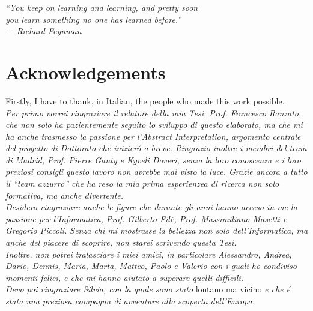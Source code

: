 \cleardoublepage
{}
{}

\begin{flushright}{
	\slshape
	``You keep on learning and learning, and pretty soon \\ you learn something no one has learned before.''} \\
	\medskip
    --- \emph{Richard Feynman}
\end{flushright}


\bigskip

\begingroup
\let\clearpage\relax
\let\cleardoublepage\relax
\let\cleardoublepage\relax

\chapter*{Acknowledgements}

\noindent Firstly, I have to thank, in Italian, the people who made this work possible. \\

\textit{Per primo vorrei ringraziare il relatore della mia Tesi, Prof. Francesco Ranzato, che non solo ha pazientemente seguito lo sviluppo di questo elaborato,
ma che mi ha anche trasmesso la passione per l'Abstract Interpretation, argomento centrale del progetto di Dottorato che inizieró a breve.
Ringrazio inoltre i membri del team di Madrid, Prof. Pierre Ganty e Kyveli Doveri,
senza la loro conoscenza e i loro preziosi consigli questo lavoro non avrebbe mai visto la luce.
Grazie ancora a tutto il ``team azzurro'' che ha reso la mia prima esperienzea di ricerca non solo formativa,
ma anche divertente.  }\\

\emph{Desidero ringraziare anche le figure che durante gli anni hanno acceso in me la passione per l'Informatica,
Prof. Gilberto Filé, Prof. Massimiliano Masetti e Gregorio Piccoli.
Senza chi mi mostrasse la bellezza non solo dell'Informatica, ma anche del piacere di
scoprire, non starei scrivendo questa Tesi. } \\

\emph{Inoltre, non potrei tralasciare i miei amici, in particolare
Alessandro,
Andrea,
Dario,
Dennis,
Maria,
Marta,
Matteo,
Paolo e
Valerio
con i quali ho condiviso momenti felici, e che mi hanno aiutato a superare quelli difficili.} \\

\emph{Devo poi ringraziare Silvia, con la quale sono stato} lontano ma vicino \emph{e che é stata una preziosa compagna di
avventure alla scoperta dell'Europa.} \\

